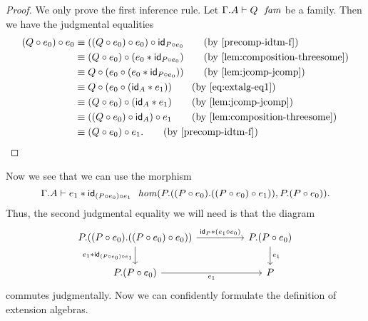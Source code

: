 \begin{proof}
We only prove the first inference rule. Let $\jfam{{\Gamma}{A}}{Q}$ be a family.
Then we have the judgmental equalities
\begin{align*}
\jcomp{}{e_0}{\jcomp{}{e_0}{Q}}
& \jdeq
  \jcomp{}{\idtm{\jcomp{}{e_0}{P}}}{\jcomp{}{e_0}{\jcomp{}{e_0}{Q}}}
  \tag{by \autoref{precomp-idtm-f}}
  \\
& \jdeq
  \jcomp{}{\jvcomp{}{e_0}{\idtm{\jcomp{}{e_0}{P}}}}{\jcomp{}{e_0}{Q}}
  \tag{by \autoref{lem:composition-threesome}}
  \\
& \jdeq
  \jcomp{}{\jcomp{}{\jvcomp{}{e_0}{\idtm{\jcomp{}{e_0}{P}}}}{e_0}}{Q}
  \tag{by \autoref{lem:jcomp-jcomp}}
  \\
& \jdeq
  \jcomp{}{\jcomp{}{\jvcomp{}{\idtm{A}}{e_1}}{e_0}}{Q}
  \tag{by \autoref{eq:extalg-eq1}}
  \\
& \jdeq
  \jcomp{}{\jvcomp{}{\idtm{A}}{e_1}}{\jcomp{}{e_0}{Q}}
  \tag{by \autoref{lem:jcomp-jcomp}}
  \\
& \jdeq
  \jcomp{}{e_1}{\jcomp{}{\idtm{A}}{\jcomp{}{e_0}{Q}}}
  \tag{by \autoref{lem:composition-threesome}}
  \\
& \jdeq
  \jcomp{}{e_1}{\jcomp{}{e_0}{Q}}.
  \tag{by \autoref{precomp-idtm-f}}
\end{align*}
\end{proof}

Now we see that we can use the morphism
\begin{equation*}
\jhom
  {{\Gamma}{A}}
  {{P}{{\jcomp{}{e_0}{P}}{\jcomp{}{e_1}{{}{e_0}{P}}}}}
  {{P}{\jcomp{}{e_0}{P}}}
  {\jvcomp{}{e_1}{\idtm{\jcomp{}{e_1}{{}{e_0}{P}}}}}.
\end{equation*}
Thus, the second judgmental equality we will need is that the diagram
\begin{equation}\label{eq:extalg-eq2}
\begin{tikzcd}[column sep=huge]
\ctxext{P}{{\jcomp{}{e_0}{P}}{\jcomp{}{e_0}{{}{e_0}{P}}}} 
  \ar{r}{\jvcomp{}{\idtm{P}}{\jcomp{}{e_0}{e_1}}}
  \ar{d}[swap]{
    \jvcomp{}{e_1}{\idtm{\jcomp{}{e_1}{{}{e_0}{P}}}}
    }
& \ctxext{P}{\jcomp{}{e_0}{P}} \ar{d}{e_1}\\
\ctxext{P}{\jcomp{}{e_0}{P}} \ar{r}[swap]{e_1} & P
\end{tikzcd}
\end{equation}
commutes judgmentally. Now we can confidently formulate the definition of
extension algebras.

